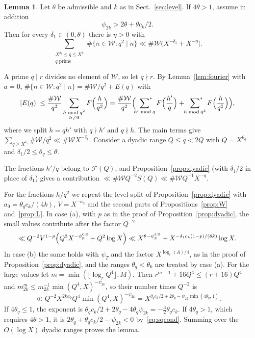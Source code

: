 \documentclass[11pt]{amsart}
\makeatletter
\theoremstyle{definition}
\newtheorem{lemma}[theorem]{Lemma}
\numberwithin{equation}{section}
\renewenvironment{proof}[1][\proofname]{\par\pushQED{\qed}\normalfont\topsep6\p@\@plus6\p@\relax\trivlist\item[\hskip\labelsep\upshape#1.]\ignorespaces}{\popQED\endtrivlist\@endpefalse}
\newcommand{\WW}{\mathcal{W}}
\newcommand{\FF}{\mathscr{F}}
\newcommand{\sumstar}{\sideset{}{^*}\sum}
\makeatother
\begin{document}
\begin{lemma}\label{lem:squares}
Let $\theta$ be admissible and $k$ as in Sect.~\ref{sec:level}. If $4\theta>1$, assume in addition
\begin{equation}\label{eq:sqcond}
\psi_{2k}>2\theta+\theta c_k/2.
\end{equation}
Then for every $\delta_1\in(0,\theta)$ there is $\eta>0$ with
\[
\sum_{\substack{X^{\delta_1}\le q\le X^{\theta}\\q\text{ prime}}}\#\{n\in\WW:q^2\mid n\}\ll\#\WW\bigl(X^{-\delta_1}+X^{-\eta}\bigr).
\]
\end{lemma}

\begin{proof}
A prime $q\mid r$ divides no element of $\WW$, so let $q\nmid r$. By Lemma~\ref{lem:fourier} with $a=0$, $\#\{n\in\WW:q^2\mid n\}=\#\WW/q^2+E(q)$ with
\[
\lvert E(q)\rvert\le\frac{\#\WW}{q^2}\sum_{\substack{h\bmod q^2\\h\not\equiv0}}F\Bigl(\frac h{q^2}\Bigr)=\frac{\#\WW}{q^2}\Bigl(\sumstar_{h'\bmod q}F\Bigl(\frac{h'}q\Bigr)+\sumstar_{h\bmod q^2}F\Bigl(\frac h{q^2}\Bigr)\Bigr),
\]
where we split $h=qh'$ with $q\nmid h'$ and $q\nmid h$. The main terms give $\sum_{q\ge X^{\delta_1}}\#\WW/q^2\ll\#\WW X^{-\delta_1}$. Consider a dyadic range $Q\le q<2Q$ with $Q=X^{\theta_q}$ and $\delta_1/2\le\theta_q\le\theta$.

The fractions $h'/q$ belong to $\FF(Q)$, and Proposition~\ref{prop:dyadic} (with $\delta_1/2$ in place of $\delta_1$) gives a contribution $\ll\#\WW Q^{-2}S(Q)\ll\#\WW Q^{-1}X^{-\eta}$.

For the fractions $h/q^2$ we repeat the level split of Proposition~\ref{prop:dyadic} with $a_0=\theta_qc_k/(4k)$, $V=X^{-a_0}$ and the second parts of Propositions~\ref{prop:W} and~\ref{prop:L}. In case (a), with $p$ as in the proof of Proposition~\ref{prop:dyadic}, the small values contribute after the factor $Q^{-2}$
\[
\ll Q^{-2}V^{1-p}\Bigl(Q^3X^{-\psi^{\mathrm{CS}}_p}+Q^2\log X\Bigr)\ll X^{\theta-\psi^{\mathrm{CS}}_p}+X^{-\delta_1c_k(1-p)/(8k)}\log X.
\]
In case (b) the same holds with $\psi_T$ and the factor $X^{\log_r(A)/4}$, as in the proof of Proposition~\ref{prop:dyadic}, and the ranges $\theta_q<\theta_0$ are treated by case (a). For the large values let $m=\min(\lfloor\log_rQ^4\rfloor,M)$. Then $r^{m+1}+16Q^4\le(r+16)Q^4$ and $m_{2k}^m\le m_{2k}^{-1}\min(Q^4,X)^{-\psi_{2k}}$, so their number times $Q^{-2}$ is
\[
\ll Q^{-2}X^{2ka_0}Q^4\min(Q^4,X)^{-\psi_{2k}}=X^{\theta_qc_k/2+2\theta_q-\psi_{2k}\min(4\theta_q,1)}.
\]
If $4\theta_q\le1$, the exponent is $\theta_qc_k/2+2\theta_q-4\theta_q\psi_{2k}=-\tfrac32\theta_qc_k$. If $4\theta_q>1$, which requires $4\theta>1$, it is $2\theta_q+\theta_qc_k/2-\psi_{2k}<0$ by~\eqref{eq:sqcond}. Summing over the $O(\log X)$ dyadic ranges proves the lemma.
\end{proof}
\end{document}
